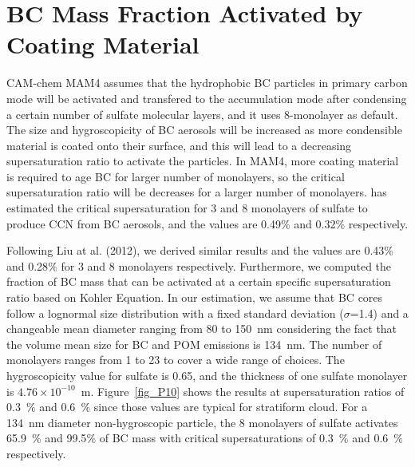 \documentclass[12pt, fullpage]{uiucthesis2009}
\begin{document}
		\section{BC Mass Fraction Activated by Coating Material}
		CAM-chem MAM4 assumes that the hydrophobic BC particles in  primary carbon mode will be activated and transfered to the accumulation mode after condensing a certain number of sulfate molecular layers, and it uses 8-monolayer as default. The size and hygroscopicity of BC aerosols will be increased as more condensible material is coated onto their surface, and this will lead to a decreasing supersaturation ratio to activate the particles. In MAM4, more coating material is required to age BC for larger number of monolayers, so the critical supersaturation ratio will be decreases for a larger number of monolayers. \citet{Liu2012} has estimated the critical supersaturation for 3 and 8 monolayers of sulfate to produce CCN from BC aerosols, and the values are 0.49$\%$ and 0.32$\%$ respectively. 
		
		Following Liu at al. (2012), we derived similar results and the values are 0.43$\%$ and 0.28$\%$ for 3 and 8 monolayers respectively. Furthermore, we computed the fraction of BC mass that can be activated at a certain specific supersaturation ratio based on Kohler Equation. In our estimation, we assume that BC cores follow a lognormal size distribution with a fixed standard deviation ($\sigma$=1.4) and a changeable mean diameter ranging from 80 to 150~nm considering the fact that the volume mean size for BC and POM emissions is 134~nm. The number of monolayers ranges from 1 to 23 to cover a wide range of choices. The hygroscopicity value for sulfate is 0.65, and the thickness of one sulfate monolayer is $4.76 \times 10^{-10}$~m. Figure~\ref{fig_P10} shows the results at supersaturation ratios of 0.3~$\%$ and 0.6~$\%$ since those values are typical for stratiform cloud. For a 134~nm diameter non-hygroscopic particle, the 8 monolayers of sulfate activates 65.9~$\%$ and 99.5$\%$ of BC mass with critical supersaturations of 0.3~$\%$ and 0.6~$\%$ respectively.  
		
\end{document}
